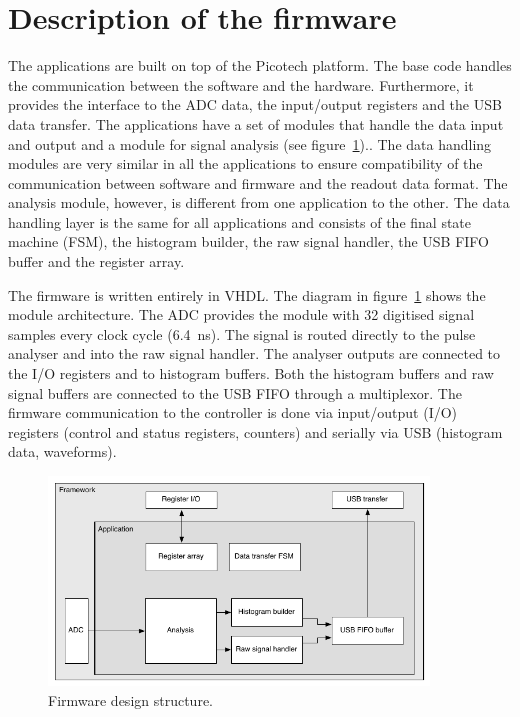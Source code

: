 \section{Description of the firmware}
The applications are built on top of the Picotech platform. The base code handles the communication between the software and the hardware. Furthermore, it provides the interface to the ADC data, the input/output registers and the USB data transfer. The applications have a set of modules that handle the data input and output and a module for signal analysis (see figure~\ref{fig:application}).. The data handling modules are very similar in all the applications to ensure compatibility of the communication between software and firmware and the readout data format. The analysis module, however, is different from one application to the other. The data handling layer is the same for all applications and consists of the final state machine (FSM), the histogram builder, the raw signal handler, the USB FIFO buffer and the register array.

The firmware is written entirely in VHDL. The diagram in figure~\ref{fig:application} shows the module architecture. The ADC provides the module with 32 digitised signal samples every clock cycle (6.4~ns). The signal is routed directly to the pulse analyser and into the raw signal handler. The analyser outputs are connected to the I/O registers and to histogram buffers. Both the histogram buffers and raw signal buffers are connected to the USB FIFO through a multiplexor. The firmware communication to the controller is done via input/output (I/O) registers (control and status registers, counters) and serially via USB (histogram data, waveforms). 


\begin{figure}[!t]
\centering
\includegraphics[width=0.9\textwidth]{05_current_monitoring/plots/application}
\caption{Firmware design structure.}
\label{fig:application}
\end{figure}


